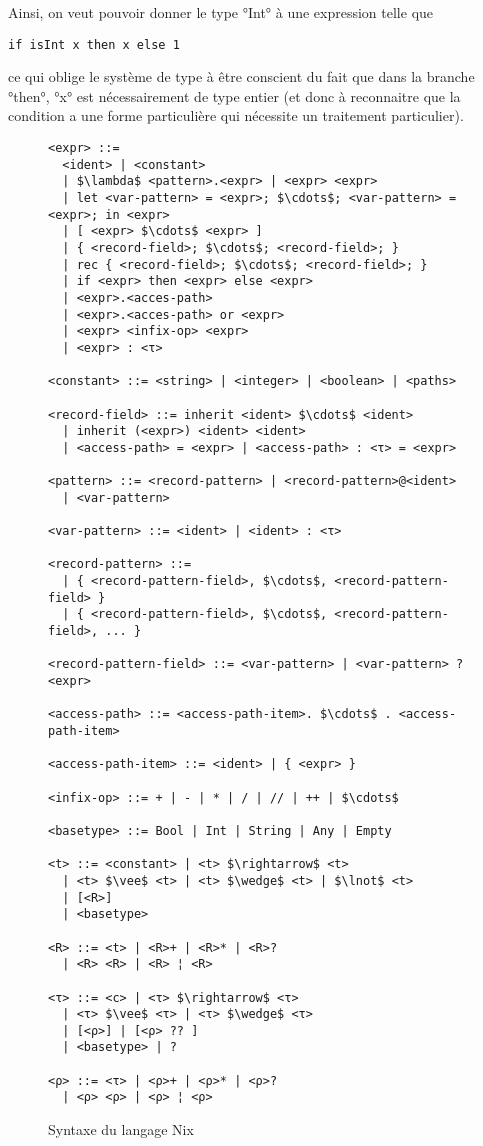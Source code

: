 Ainsi, on veut pouvoir donner le type °Int° à une expression telle que

\begin{lstlisting}
if isInt x then x else 1
\end{lstlisting}

ce qui oblige le système de type à être conscient du fait que dans la branche
°then°, °x° est nécessairement de type entier (et donc à reconnaitre que la
condition a une forme particulière qui nécessite un traitement particulier).

\begin{figure}
  \small
  \begin{lstlisting}
<expr> ::=
  <ident> | <constant>
  | $\lambda$ <pattern>.<expr> | <expr> <expr>
  | let <var-pattern> = <expr>; $\cdots$; <var-pattern> = <expr>; in <expr>
  | [ <expr> $\cdots$ <expr> ]
  | { <record-field>; $\cdots$; <record-field>; }
  | rec { <record-field>; $\cdots$; <record-field>; }
  | if <expr> then <expr> else <expr>
  | <expr>.<acces-path>
  | <expr>.<acces-path> or <expr>
  | <expr> <infix-op> <expr>
  | <expr> : <τ>

<constant> ::= <string> | <integer> | <boolean> | <paths>

<record-field> ::= inherit <ident> $\cdots$ <ident>
  | inherit (<expr>) <ident> <ident>
  | <access-path> = <expr> | <access-path> : <τ> = <expr>

<pattern> ::= <record-pattern> | <record-pattern>@<ident>
  | <var-pattern>

<var-pattern> ::= <ident> | <ident> : <τ>

<record-pattern> ::=
  | { <record-pattern-field>, $\cdots$, <record-pattern-field> }
  | { <record-pattern-field>, $\cdots$, <record-pattern-field>, ... }

<record-pattern-field> ::= <var-pattern> | <var-pattern> ? <expr>

<access-path> ::= <access-path-item>. $\cdots$ . <access-path-item>

<access-path-item> ::= <ident> | { <expr> }

<infix-op> ::= + | - | * | / | // | ++ | $\cdots$

<basetype> ::= Bool | Int | String | Any | Empty

<t> ::= <constant> | <t> $\rightarrow$ <t>
  | <t> $\vee$ <t> | <t> $\wedge$ <t> | $\lnot$ <t>
  | [<R>]
  | <basetype>

<R> ::= <t> | <R>+ | <R>* | <R>?
  | <R> <R> | <R> ¦ <R>

<τ> ::= <c> | <τ> $\rightarrow$ <τ>
  | <τ> $\vee$ <τ> | <τ> $\wedge$ <τ>
  | [<ρ>] | [<ρ> ?? ]
  | <basetype> | ?

<ρ> ::= <τ> | <ρ>+ | <ρ>* | <ρ>?
  | <ρ> <ρ> | <ρ> ¦ <ρ>
  \end{lstlisting}
  \caption{Syntaxe du langage Nix\label{nix::syntax}}
\end{figure}


